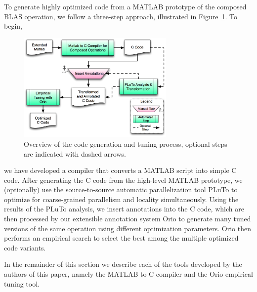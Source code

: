 \documentclass[runningheads]{llncs}
\begin{document}
To generate highly optimized code from a MATLAB prototype of the composed BLAS operation, we follow a three-step approach, illustrated in Figure~\ref{fig:process}.  To begin,
%
\begin{figure}
\vspace{-.2in}
\centering
\includegraphics[width=3in]{figures/process.png}
\caption{Overview of the code generation and tuning process, optional steps are indicated with dashed arrows.}
\label{fig:process}
\vspace{-.1in}
\end{figure}
%
we have developed a compiler that converts a MATLAB script into simple C code.
After generating the C code from the high-level MATLAB prototype, we (optionally) use the source-to-source automatic parallelization tool PLuTo\cite{Pluto} %
to optimize for coarse-grained parallelism and locality simultaneously. Using the results of the PLuTo analysis, we insert annotations into the C code, which are then processed by our extensible annotation system Orio to generate many tuned versions of the same operation using different optimization parameters. Orio then performs an empirical search to select the best among the multiple optimized code variants.


In the remainder of this section we describe each of the tools developed by the authors of this paper, namely the MATLAB to C compiler and the Orio empirical tuning tool.

\vspace{-.2in}
\end{document}
